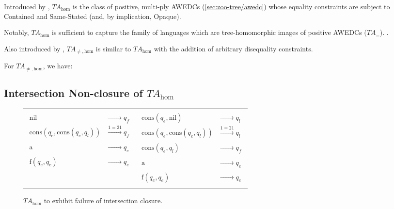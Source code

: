 
Introduced by \cite[Definition 4.1]{godoy:hom}, $TA_{\text{hom}}$ is the
class of positive, multi-ply AWEDCs (\autoref{sec:zoo-tree/awedc}) whose
equality constraints are subject to Contained and Same-Stated (and, by
implication, Opaque).

Notably, $TA_{\text{hom}}$ is sufficient to capture the family of languages
which are tree-homomorphic images of positive AWEDCs (\ie $TA_{=}$).
\cite[Proposition 4.6]{godoy:hom}.

Also introduced by \cite[Definition 4.1]{godoy:hom}, $TA_{\neq,\text{hom}}$
is similar to $TA_{\text{hom}}$ with the addition of arbitrary disequality
constraints.

For $TA_{\neq,\text{hom}}$, we have:

\subsection{Intersection Non-closure of $TA_{\text{hom}}$}

\begin{wrapfigure}{l}{3.75in}\centering\begin{tabular}{cc}
	{$\!\begin{aligned}
	\text{nil} &\xrightarrow{\phantom{1=21}} q_f \\
    \text{cons}(q_e, \text{cons}(q_e,q_l)) &\xrightarrow{1=21} q_f \\
    \text{a} &\xrightarrow{\phantom{1=21}} q_e \\
    \text{f}(q_e,q_e) &\xrightarrow{\phantom{1=21}} q_e \\
    \end{aligned}$}
&
	{$\!\begin{aligned}
    \text{cons}(q_e, \text{nil}) &\xrightarrow{\phantom{1=21}} q_l \\
    \text{cons}(q_e, \text{cons}(q_e,q_l)) &\xrightarrow{1=21} q_l \\
    \text{cons}(q_e, q_l) &\xrightarrow{\phantom{1=21}} q_f \\
    \text{a} &\xrightarrow{\phantom{1=21}} q_e \\
    \text{f}(q_e,q_e) &\xrightarrow{\phantom{1=21}} q_e \\
    \end{aligned}$}
\end{tabular}
\caption{$TA_{\text{hom}}$ to exhibit failure of intersection
closure.}
\label{fig:zoo-tree/tahom:icf}
\end{wrapfigure}

